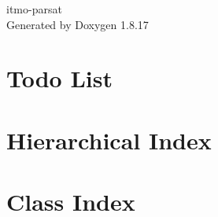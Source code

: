 \let\mypdfximage\pdfximage\def\pdfximage{\immediate\mypdfximage}\documentclass[twoside]{book}
\newcommand{\+}{\discretionary{\mbox{\scriptsize$\hookleftarrow$}}{}{}}
\newcommand{\clearemptydoublepage}{%
  \newpage{\pagestyle{empty}\cleardoublepage}%
}
\begin{document}
\hypersetup{pageanchor=false,
             bookmarksnumbered=true,
             pdfencoding=unicode
            }
\begin{titlepage}
\vspace*{7cm}
\begin{center}%
{\Large itmo-\/parsat }\\
\vspace*{1cm}
{\large Generated by Doxygen 1.8.17}\\
\end{center}
\end{titlepage}
\clearemptydoublepage
{}
\tableofcontents
\clearemptydoublepage
{}
\hypersetup{pageanchor=true}

\chapter{Todo List}
\label{todo}

\chapter{Hierarchical Index}

\chapter{Class Index}

\end{document}
